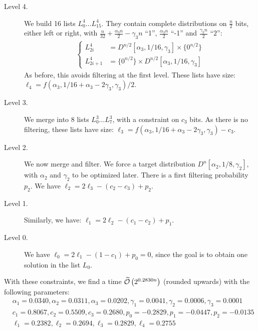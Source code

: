 \begin{description}
\item[Level 4.] We build 16 lists $L_0^4 \ldots L_{15}^4$. They contain complete distributions on $\frac{n}{2}$ bits, either left or right, with $\frac{n}{32} + \frac{\alpha_3 n}{2} - \gamma_3 n$ ``1'',  $\frac{\alpha_3 n}{2}$ ``-1'' and $\frac{\gamma_3 n}{2}$ ``$2$'':
\begin{align*}
\left\{ \begin{matrix}
L_{2i}^4 & = D^{n/2}[\alpha_3, 1/16, \gamma_3] \times \{ 0^{n/2} \} \\
L_{2i+1}^4 & =  \{ 0^{n/2} \} \times D^{n/2}[\alpha_3, 1/16, \gamma_3] 
\end{matrix} \right.
\end{align*}
As before, this avoids filtering at the first level. These lists have size: $\ell_4 = f(\alpha_3, 1/16 + \alpha_3 - 2\gamma_3, \gamma_3) / 2$.

\item[Level 3.] We merge into 8 lists $L_0^3 \ldots L_7^3$, with a constraint on $c_3$ bits. As there is no filtering, these lists have size: $\ell_3 = f(\alpha_3, 1/16 + \alpha_3 - 2\gamma_3, \gamma_3) - c_3$.

\item[Level 2.] We now merge and filter. We force a target distribution $D^{n}[\alpha_2, 1/8, \gamma_2]$, with $\alpha_2$ and $\gamma_2$ to be optimized later. There is a first filtering probability $p_2$.
We have $\ell_2 = 2\ell_3 - (c_2 - c_3) + p_2$.
\item[Level 1.] Similarly, we have: $\ell_1 = 2\ell_2 - (c_1 - c_2) + p_1$.
\item[Level 0.] We have $\ell_0 = 2\ell_1 - (1-c_1) + p_0 = 0$, since the goal is to obtain one solution in the list $L_0$.
\end{description}

With these constraints, we find a time $\widetilde{\mathcal{O}} \left(2^{0.2830n} \right)$ (rounded upwards) with the following parameters:
\begin{align*}
&\alpha_1 = 0.0340, \alpha_2 = 0.0311, \alpha_3 = 0.0202, \gamma_1 = 0.0041, \gamma_2 = 0.0006, \gamma_3 = 0.0001 \\
&c_1 = 0.8067, c_2 = 0.5509, c_3 = 0.2680, p_0 = -0.2829, p_1 = -0.0447, p_2 = -0.0135 \\
&\ell_1 = 0.2382, \ell_2 = 0.2694, \ell_3 = 0.2829, \ell_4 = 0.2755 
\end{align*}


